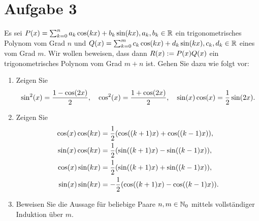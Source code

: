 \documentclass{exercise}
\begin{document}
    \section*{Aufgabe 3}

    \begin{problem}
        Es sei \(P\parentheses*{x} = \sum_{k = 0}^n a_k \cos\parentheses*{kx} + b_k \sin\parentheses*{kx}, a_k, b_k \in \R\) ein trigonometrisches Polynom vom Grad \(n\) und \(Q\parentheses*{x} = \sum_{k = 0}^m c_k \cos\parentheses*{kx} + d_k \sin\parentheses*{kx}, c_k, d_k \in \R\) eines vom Grad \(m\).
        Wir wollen beweisen, dass dann \(R\parentheses*{x} := P\parentheses*{x}Q\parentheses*{x}\) ein trigonometrisches Polynom vom Grad \(m + n\) ist.
        Gehen Sie dazu wie folgt vor:
        \begin{enumerate}
            \item Zeigen Sie
            \[
                \sin^2\parentheses*{x} = \frac{1 - \cos\parentheses*{2x}}{2}, \quad \cos^2\parentheses*{x} = \frac{1 + \cos\parentheses*{2x}}{2}, \quad \sin\parentheses*{x}\cos\parentheses*{x} = \frac{1}{2}\sin\parentheses*{2x}.
            \]
            \item Zeigen Sie
            \begin{align*}
                \cos\parentheses*{x}\cos\parentheses*{kx} &= \frac{1}{2}\parentheses*{\cos\parentheses*{\parentheses*{k + 1}x} + \cos\parentheses*{\parentheses*{k - 1}x}},\\
                \sin\parentheses*{x}\cos\parentheses*{kx} &= \frac{1}{2}\parentheses*{\sin\parentheses*{\parentheses*{k + 1}x} - \sin\parentheses*{\parentheses*{k - 1}x}},\\
                \cos\parentheses*{x}\sin\parentheses*{kx} &= \frac{1}{2}\parentheses*{\sin\parentheses*{\parentheses*{k + 1}x} + \sin\parentheses*{\parentheses*{k - 1}x}},\\
                \sin\parentheses*{x}\sin\parentheses*{kx} &= -\frac{1}{2}\parentheses*{\cos\parentheses*{\parentheses*{k + 1}x} - \cos\parentheses*{\parentheses*{k - 1}x}}.
            \end{align*}
            \item Beweisen Sie die Aussage für beliebige Paare \(n, m \in \mathbb{N}_0\) mittels vollständiger Induktion über \(m\).
        \end{enumerate}
    \end{problem}
\end{document}
